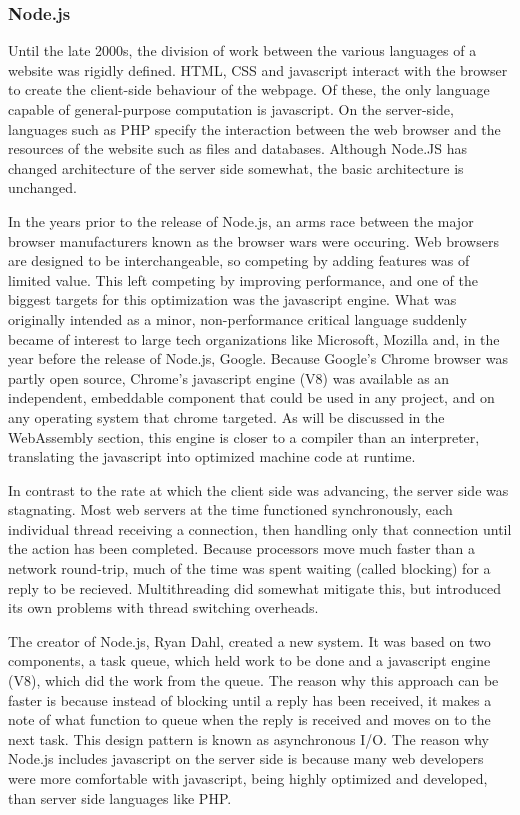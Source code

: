 \documentclass{article}
\begin{document}
\subsubsection{Node.js}

Until the late 2000s, the division of work between the various languages of a website was rigidly defined. HTML, CSS and javascript interact with the browser to create the client-side behaviour of the webpage. Of these, the only language capable of general-purpose computation is javascript. On the server-side, languages such as PHP specify the interaction between the web browser and the resources of the website such as files and databases. Although Node.JS has changed architecture of the server side somewhat, the basic architecture is unchanged.

In the years prior to the release of Node.js, an arms race between the major browser manufacturers known as the browser wars were occuring. Web browsers are designed to be interchangeable, so competing by adding features was of limited value. This left competing by improving performance, and one of the biggest targets for this optimization was the javascript engine. What was originally intended as a minor, non-performance critical language suddenly became of interest to large tech organizations like Microsoft, Mozilla and, in the year before the release of Node.js, Google. Because Google's Chrome browser was partly open source, Chrome's javascript engine (V8) was available as an independent, embeddable component that could be used in any project, and on any operating system that chrome targeted. As will be discussed in the WebAssembly section, this engine is closer to a compiler than an interpreter, translating the javascript into optimized machine code at runtime.

In contrast to the rate at which the client side was advancing, the server side was stagnating. Most web servers at the time functioned synchronously, each individual thread receiving a connection, then handling only that connection until the action has been completed. Because processors move much faster than a network round-trip, much of the time was spent waiting (called blocking) for a reply to be recieved. Multithreading did somewhat mitigate this, but introduced its own problems with thread switching overheads.

The creator of Node.js, Ryan Dahl, created a new system. It was based on two components, a task queue, which held work to be done and a javascript engine (V8), which did the work from the queue. The reason why this approach can be faster is because instead of blocking until a reply has been received, it makes a note of what function to queue when the reply is received and moves on to the next task. This design pattern is known as asynchronous I/O. The reason why Node.js includes javascript on the server side is because many web developers were more comfortable with javascript, being highly optimized and developed, than server side languages like PHP. 
\end{document}
